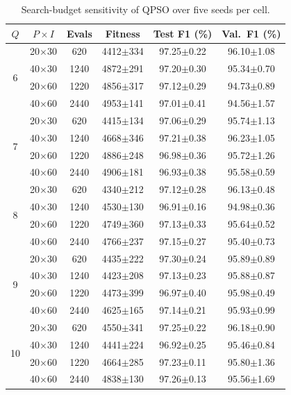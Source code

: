 \documentclass[conference]{IEEEtran}
\begin{document}
\begin{table}[!t]
\centering
\scriptsize
\caption{Search-budget sensitivity of QPSO over five seeds per cell.}
\label{tab:budget_sensitivity}
\setlength{\tabcolsep}{3pt}
\begin{tabular}{cccccc}
\hline\toprule
$Q$ & $P{\times}I$ & Evals & Fitness & Test F1 (\%) & Val.\ F1 (\%) \\
\hline\toprule
\multirow{4}{*}{6} & 20$\times$30 & 620 & 4412$\pm$334 & 97.25$\pm$0.22 & 96.10$\pm$1.08 \\
 & 40$\times$30 & 1240 & 4872$\pm$291 & 97.20$\pm$0.30 & 95.34$\pm$0.70 \\
 & 20$\times$60 & 1220 & 4856$\pm$317 & 97.12$\pm$0.29 & 94.73$\pm$0.89 \\
 & 40$\times$60 & 2440 & 4953$\pm$141 & 97.01$\pm$0.41 & 94.56$\pm$1.57 \\
\midrule
\multirow{4}{*}{7} & 20$\times$30 & 620 & 4415$\pm$134 & 97.06$\pm$0.29 & 95.74$\pm$1.13 \\
 & 40$\times$30 & 1240 & 4668$\pm$346 & 97.21$\pm$0.38 & 96.23$\pm$1.05 \\
 & 20$\times$60 & 1220 & 4886$\pm$248 & 96.98$\pm$0.36 & 95.72$\pm$1.26 \\
 & 40$\times$60 & 2440 & 4906$\pm$181 & 96.93$\pm$0.38 & 95.58$\pm$0.59 \\
\midrule
\multirow{4}{*}{8} & 20$\times$30 & 620 & 4340$\pm$212 & 97.12$\pm$0.28 & 96.13$\pm$0.48 \\
 & 40$\times$30 & 1240 & 4530$\pm$130 & 96.91$\pm$0.16 & 94.98$\pm$0.36 \\
 & 20$\times$60 & 1220 & 4749$\pm$360 & 97.13$\pm$0.33 & 95.64$\pm$0.52 \\
 & 40$\times$60 & 2440 & 4766$\pm$237 & 97.15$\pm$0.27 & 95.40$\pm$0.73 \\
\midrule
\multirow{4}{*}{9} & 20$\times$30 & 620 & 4435$\pm$222 & 97.30$\pm$0.24 & 95.89$\pm$0.89 \\
 & 40$\times$30 & 1240 & 4423$\pm$208 & 97.13$\pm$0.23 & 95.88$\pm$0.87 \\
 & 20$\times$60 & 1220 & 4473$\pm$399 & 96.97$\pm$0.40 & 95.98$\pm$0.49 \\
 & 40$\times$60 & 2440 & 4625$\pm$165 & 97.14$\pm$0.21 & 95.93$\pm$0.99 \\
\midrule
\multirow{4}{*}{10} & 20$\times$30 & 620 & 4550$\pm$341 & 97.25$\pm$0.22 & 96.18$\pm$0.90 \\
 & 40$\times$30 & 1240 & 4441$\pm$224 & 96.92$\pm$0.25 & 95.46$\pm$0.84 \\
 & 20$\times$60 & 1220 & 4664$\pm$285 & 97.23$\pm$0.11 & 95.80$\pm$1.36 \\
 & 40$\times$60 & 2440 & 4838$\pm$130 & 97.26$\pm$0.13 & 95.56$\pm$1.69 \\
\hline\toprule
\end{tabular}
\end{table}
\end{document}
